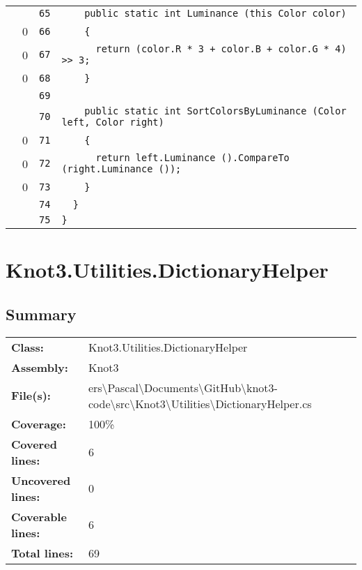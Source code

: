 \documentclass[a4paper,10pt]{article}
\begin{document}
\begin{longtable}[l]{lrrl}
\cellcolor{gray} &  & \verb~65~ & \verb~    public static int Luminance (this Color color)~\\
\cellcolor{red} & 0 & \verb~66~ & \verb~    {~\\
\cellcolor{red} & 0 & \verb~67~ & \verb~      return (color.R * 3 + color.B + color.G * 4) >> 3;~\\
\cellcolor{red} & 0 & \verb~68~ & \verb~    }~\\
\cellcolor{gray} &  & \verb~69~ & \verb~~\\
\cellcolor{gray} &  & \verb~70~ & \verb~    public static int SortColorsByLuminance (Color left, Color right)~\\
\cellcolor{red} & 0 & \verb~71~ & \verb~    {~\\
\cellcolor{red} & 0 & \verb~72~ & \verb~      return left.Luminance ().CompareTo (right.Luminance ());~\\
\cellcolor{red} & 0 & \verb~73~ & \verb~    }~\\
\cellcolor{gray} &  & \verb~74~ & \verb~  }~\\
\cellcolor{gray} &  & \verb~75~ & \verb~}~\\
\end{longtable}
\newpage
\section{Knot3.Utilities.DictionaryHelper}
\subsection{Summary}
\begin{longtable}[l]{ll}
\textbf{Class:} & Knot3.Utilities.DictionaryHelper\\
\textbf{Assembly:} & Knot3\\
\textbf{File(s):} & \begin{minipage}[t]{12cm}{ers\textbackslash Pascal\textbackslash Documents\textbackslash GitHub\textbackslash knot3-code\textbackslash src\textbackslash Knot3\textbackslash Utilities\textbackslash DictionaryHelper.cs}\end{minipage} \\
\textbf{Coverage:} & 100\%\\
\textbf{Covered lines:} & 6\\
\textbf{Uncovered lines:} & 0\\
\textbf{Coverable lines:} & 6\\
\textbf{Total lines:} & 69\\
\end{longtable}
\end{document}
